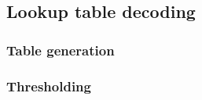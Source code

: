 \subsection{Lookup table decoding}
\subsubsection{Table generation}\label{App: lookup_table}


\subsubsection{Thresholding}\label{App: steane_thresholding}


